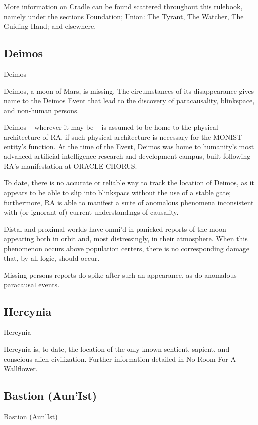 More information on Cradle can be found scattered throughout this rulebook, namely under the  
sections Foundation; Union: The Tyrant, The Watcher, The Guiding Hand; and elsewhere.    

\subsection{Deimos}
Deimos  

Deimos, a moon of Mars, is missing. The circumstances of its disappearance gives name to the  
Deimos Event that lead to the discovery of paracausality, blinkspace, and non-human persons. 
 

Deimos -- wherever it may be -- is assumed to be home to the physical architecture of RA, if  
such physical architecture is necessary for the MONIST entity’s function. At the time of the  
Event, Deimos was home to humanity’s most advanced artificial intelligence research and  
development campus, built following RA’s manifestation at ORACLE CHORUS. 
 

To date, there is no accurate or reliable way to track the location of Deimos, as it appears to be  
able to slip into blinkspace without the use of a stable gate; furthermore, RA is able to manifest a  
suite of anomalous phenomena inconsistent with (or ignorant of) current understandings of  
causality.    
 

Distal and proximal worlds have omni’d in panicked reports of the moon appearing both in orbit  
and, most distressingly, in their atmosphere. When this phenomenon occurs above population  
centers, there is no corresponding damage that, by all logic, should occur.
 

Missing persons reports do spike after such an appearance, as do anomalous paracausal  
events. 
 

                                                                                                                  

\subsection{Hercynia}
Hercynia  

Hercynia is, to date, the location of the only known sentient, sapient, and conscious alien  
civilization. Further information detailed in No Room For A Wallflower.  
 
\subsection{Bastion (Aun’Ist)}
Bastion (Aun’Ist)  

